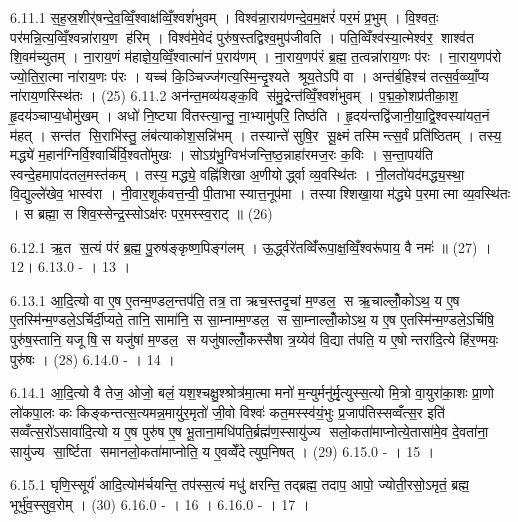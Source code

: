 6.11.1
स॒ह॒स्र॒शीर्॑षन्दे॒व॒व्विँ॒श्वाक्ष॑व्विँ॒श्वशं॑भुवम् । विश्व॑न्ना॒राय॑णन्दे॒व॒म॒क्षरं॑ पर॒मं प्र॒भुम् । वि॒श्वतः॒ पर॑मन्नि॒त्य॒व्विँ॒श्वन्ना॑राय॒ण ह॑रिम् । विश्व॑मे॒वेदं पुरु॑ष॒स्तद्विश्व॒मुप॑जीवति । पति॒व्विँश्व॑स्या॒त्मेश्व॑र॒ शाश्व॑त शि॒वम॑च्युतम् । ना॒राय॒णं म॑हाज्ञे॒य॒व्विँ॒श्वात्मा॑नं प॒राय॑णम् । ना॒राय॒णप॑रं ब्र॒ह्म॒ त॒त्वन्ना॑राय॒णः प॑रः । ना॒राय॒णप॑रो ज्यो॒ति॒रा॒त्मा ना॑राय॒णः प॑रः । यच्च॑ कि॒ञ्चिज्ज॑गत्य॒स्मि॒न्दृ॒श्यते श्रूय॒तेऽपि॑ वा । अन्त॑र्ब॒हिश्च॑ तत्स॒र्व॒व्व्याँ॒प्य ना॑राय॒णस्स्थि॑तः । (25)
6.11.2
अन॑न्त॒मव्य॑यङ्क॒वि स॑मु॒द्रेन्त॑व्विँ॒श्वशं॑भुवम् । प॒द्म॒को॒शप्र॑तीका॒श॒ हृ॒दय॑ञ्चाप्य॒धोमु॑खम् । अधो॑ नि॒ष्ट्या वि॑तस्त्या॒न्तु॒ ना॒भ्यामु॑परि॒ तिष्ठ॑ति । हृ॒दय॑न्तद्वि॑जानी॒या॒द्वि॒श्वस्या॑यत॒नं म॑हत् । सन्त॑त सि॒राभि॑स्तु॒ लंब॑त्याकोश॒सन्नि॑भम् । तस्यान्ते॑ सुषि॒र सू॒क्ष्मं तस्मिन्त्स॒र्वं प्रति॑ष्ठितम् । तस्य॒ मद्ध्ये॑ म॒हान॑ग्निर्वि॒श्वार्चि॑र्वि॒श्वतो॑मुखः । सोऽग्र॑भु॒ग्विभ॑जन्ति॒ष्ठ॒न्नाहा॑रमज॒रः क॒विः । स॒न्ता॒पय॑ति स्वन्दे॒हमापा॑दतल॒मस्त॑कम् । तस्य॒ मद्ध्ये॒ वह्नि॑शिखा अ॒णीयोर्द्ध्वा व्य॒वस्थि॑तः । नी॒लतो॑यद॑मद्ध्य॒स्था॒ वि॒द्युल्ले॑खेव॒ भास्व॑रा । नी॒वार॒शूक॑वत्त॒न्वी॒ पी॒ताभास्यात्त॒नूप॑मा । तस्याश्शिखा॒या म॑द्ध्ये प॒रमात्मा व्य॒वस्थि॑तः । स ब्रह्मा॒ स शिव॒स्सेन्द्र॒स्सोऽक्ष॑रः पर॒मस्स्व॒राट् ॥ (26)
\anuvakamend

6.12.1
ऋ॒त स॒त्यं प॑रं ब्र॒ह्म॒ पु॒रुष॑ङ्कृष्ण॒पिङ्ग॑लम् । ऊ॒र्द्ध्वरे॑तव्विँ॑रूपा॒क्ष॒व्विँ॒श्वरू॑पाय॒ वै नमः॑ ॥ (27) ।12।
6.13.0
- । 13 ।
\anuvakamend

6.13.1
आ॒दि॒त्यो वा ए॒ष ए॒तन्म॒ण्डल॒न्तप॑ति॒ तत्र॒ ता ऋच॒स्तदृ॒चां म॒ण्डल॒ स ऋ॒चाल्लोँ॒कोऽथ॒ य ए॒ष ए॒तस्मि॑न्म॒ण्डले॒ऽर्चिर्दी॒प्यते॒ तानि॒ सामा॑नि॒ स सा॒म्नाम्म॒ण्डल॒ स सा॒म्नाल्लोँ॒कोऽथ॒ य ए॒ष ए॒तस्मि॑न्म॒ण्डले॒ऽर्चिषि॒ पुरु॑ष॒स्तानि॒ यजूषि॒ स यजु॑षां म॒ण्डल॒ स यजु॑षाल्लोँ॒कस्सैषा त्र॒य्येव॑ वि॒द्या त॑पति॒ य ए॒षोन्तरा॑दि॒त्ये हि॑र॒ण्मयः॒ पुरु॑षः । (28)
6.14.0
- । 14 ।
\anuvakamend

6.14.1
आ॒दि॒त्यो वै तेज॒ ओजो॒ बलं॒ यश॒श्चक्षु॒श्श्रोत्र॑मा॒त्मा मनो॑ म॒न्युर्मनु॑र्मृ॒त्युस्स॒त्यो मि॒त्रो वा॒युरा॑का॒शः प्रा॒णो लो॑कपा॒लः कः किङ्कन्तत्स॒त्यमन्न॒मायु॑र॒मृतो॑ जी॒वो विश्वः॑ कत॒मस्स्व॑यं॒भुः प्र॒जाप॑तिस्सव्वँत्स॒र इति॑ सव्वँत्स॒रो॑ऽसावा॑दि॒त्यो य ए॒ष पुरु॑ष ए॒ष भू॒ताना॒मधि॑पति॒र्ब्रह्म॑ण॒स्सायु॑ज्य सलो॒कता॑माप्नोत्ये॒तासा॑मे॒व दे॒वता॑ना॒ सायु॑ज्य सा॒र्ष्टिता समानलो॒कता॑माप्नोति॒ य ए॒वव्वेँदेत्युप॒निषत् । (29)
6.15.0
- । 15 ।
\anuvakamend

6.15.1
घृणि॒स्सूर्य॑ आदि॒त्योम॑र्चयन्ति॒ तप॑स्स॒त्यं मधु॑ क्षरन्ति॒ तद्ब्रह्म॒ तदाप॒ आपो॒ ज्योती॒रसो॒ऽमृतं॒ ब्रह्म॒ भूर्भु॑व॒स्सुव॒रोम् । (30)
6.16.0
- । 16 ।
6.16.0
- । 17 ।
\anuvakamend

